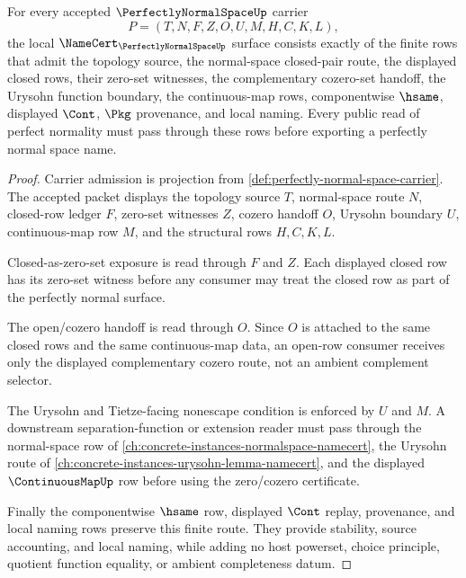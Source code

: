 \begin{theorem}
\label{thm:perfectly-normal-space-namecert-obligations}
For every accepted $\PerfectlyNormalSpaceUp$ carrier
$$
P=(T,N,F,Z,O,U,M,H,C,K,L),
$$
the local $\NameCert_{\PerfectlyNormalSpaceUp}$ surface consists exactly of the finite rows that admit the topology source, the normal-space closed-pair route, the displayed closed rows, their zero-set witnesses, the complementary cozero-set handoff, the Urysohn function boundary, the continuous-map rows, componentwise $\hsame$, displayed $\Cont$, $\Pkg$ provenance, and local naming. Every public read of perfect normality must pass through these rows before exporting a perfectly normal space name.
\end{theorem}
\begin{proof}
Carrier admission is projection from \autoref{def:perfectly-normal-space-carrier}. The accepted packet displays the topology source $T$, normal-space route $N$, closed-row ledger $F$, zero-set witnesses $Z$, cozero handoff $O$, Urysohn boundary $U$, continuous-map row $M$, and the structural rows $H,C,K,L$.

Closed-as-zero-set exposure is read through $F$ and $Z$. Each displayed closed row has its zero-set witness before any consumer may treat the closed row as part of the perfectly normal surface.

The open/cozero handoff is read through $O$. Since $O$ is attached to the same closed rows and the same continuous-map data, an open-row consumer receives only the displayed complementary cozero route, not an ambient complement selector.

The Urysohn and Tietze-facing nonescape condition is enforced by $U$ and $M$. A downstream separation-function or extension reader must pass through the normal-space row of \autoref{ch:concrete-instances-normalspace-namecert}, the Urysohn route of \autoref{ch:concrete-instances-urysohn-lemma-namecert}, and the displayed $\ContinuousMapUp$ row before using the zero/cozero certificate.

Finally the componentwise $\hsame$ row, displayed $\Cont$ replay, provenance, and local naming rows preserve this finite route. They provide stability, source accounting, and local naming, while adding no host powerset, choice principle, quotient function equality, or ambient completeness datum.
\end{proof}


